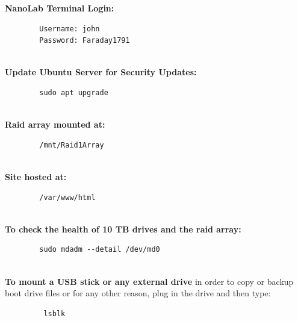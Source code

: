 \documentclass[titlepage]{article}
\begin{document}
    \noindent\textbf{NanoLab Terminal Login:}
    
    \begin{verbatim}
        Username: john
        Password: Faraday1791
    \end{verbatim}

    \noindent\makebox[\linewidth]{\rule{\textwidth}{0.4pt}}
    \\

    \noindent\textbf{Update Ubuntu Server for Security Updates:}
    
    \begin{verbatim}
        sudo apt upgrade
    \end{verbatim}

    \noindent\makebox[\linewidth]{\rule{\textwidth}{0.4pt}}
    \\

    \noindent\textbf{Raid array mounted at:} 
    
    \begin{verbatim}
        /mnt/Raid1Array
    \end{verbatim}
    
    \noindent\makebox[\linewidth]{\rule{\textwidth}{0.4pt}}
    \\
    
    \noindent\textbf{Site hosted at:} 
    
    \begin{verbatim}
        /var/www/html
    \end{verbatim}
    
    \noindent\makebox[\linewidth]{\rule{\textwidth}{0.4pt}}
    \\
    
    \noindent\textbf{To check the health of 10 TB drives and the raid array:}
    
    \begin{verbatim}
        sudo mdadm --detail /dev/md0
    \end{verbatim}
    
    \noindent\makebox[\linewidth]{\rule{\textwidth}{0.4pt}}
    \\
    
    \noindent\textbf{To mount a USB stick or any external drive} in order to copy or backup boot drive files or for any other reason, plug in the drive and then type:
    \\
    
    \begin{verbatim}
         lsblk
    \end{verbatim}
    
\end{document}
